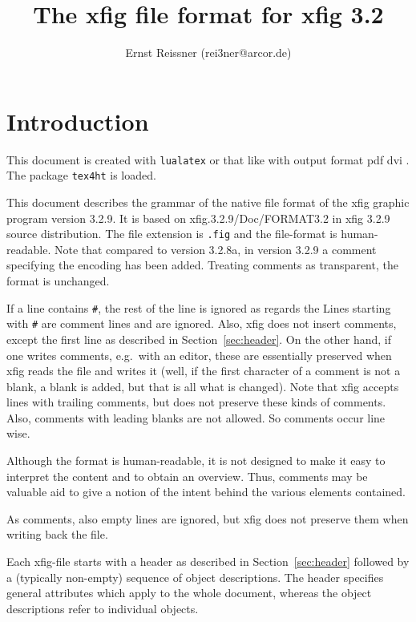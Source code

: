 \documentclass[10pt, a4paper, english]{article}%
\title{The xfig file format for xfig 3.2 }
\author{Ernst Reissner (rei3ner@arcor.de)}
\date{\Today}
\begin{document}
\maketitle
\tableofcontents

\section{Introduction}

This document is created with \texttt{lualatex} or that like 
with output format 
\ifpdf%
pdf%
\else
dvi%
\fi.
The package \texttt{tex4ht} 
is  loaded. 

This document describes the grammar 
of the native file format of the xfig graphic program version 3.2.9. 
It is based on xfig.3.2.9/Doc/FORMAT3.2 in xfig 3.2.9 source distribution. 
The file extension is \texttt{.fig} and the file-format is human-readable. 
Note that compared to version 3.2.8a, in version 3.2.9 
a comment specifying the encoding has been added. 
Treating comments as transparent, the format is unchanged. 

If a line contains \texttt{\#}, 
the rest of the line is ignored as regards the 
Lines starting with \texttt{\#} are comment lines and are ignored. 
Also, xfig does not insert comments, 
except the first line as described in Section~\ref{sec:header}. 
On the other hand, if one writes comments, e.g.~with an editor, 
these are essentially preserved when xfig reads the file and writes it 
(well, if the first character of a comment is not a blank, 
a blank is added, but that is all what is changed). 
Note that xfig accepts lines with trailing comments, 
but does not preserve these kinds of comments. 
Also, comments with leading blanks are not allowed. 
So comments occur line wise. 

Although the format is human-readable, 
it is not designed to make it easy to interpret the content 
and to obtain an overview. 
Thus, comments may be valuable aid to give a notion 
of the intent behind the various elements contained. 

As comments, also empty lines are ignored, 
but xfig does not preserve them when writing back the file. 

Each xfig-file starts with a header as described in Section~\ref{sec:header} 
followed by a (typically non-empty) sequence of object descriptions. 
The header specifies general attributes which apply to the whole document, 
whereas the object descriptions refer to individual objects. 
\end{document}
